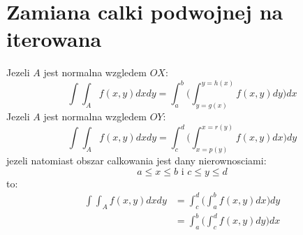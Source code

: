 \documentclass[options]{article}
\begin{document}
\section{Zamiana calki podwojnej na iterowana}
Jezeli $A$ jest normalna wzgledem $OX$:
\begin{equation}
\int \int_{A} f(x,y)dxdy = \int_a^b \bigg (\int_{y=g(x)}^{y=h(x)}f(x,y)dy \bigg )dx
\end{equation}
Jezeli $A$ jest normalna wzgledem $OY$:
\begin{equation}
\int \int_{A} f(x,y)dxdy = \int_c^d \bigg (\int_{x=p(y)}^{x=r(y)}f(x,y)dx \bigg )dy
\end{equation}
jezeli natomiast obszar calkowania jest dany nierownosciami:
\begin{equation}
  \label{}
a \le x \le b \text{  i  } c \le y \le d
\end{equation}
to:
\begin{align}
  \label{}
  \int \int_A f(x,y) dxdy &= \int_c^d \bigg (\int_a^b f(x,y)dx \bigg )dy \\
  &=  \int_a^b \bigg (\int_c^d f(x,y)dy \bigg )dx
\end{align}
\end{document}
